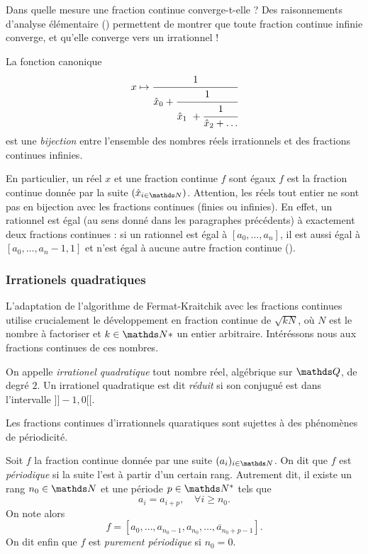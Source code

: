 Dans quelle mesure une fraction continue converge-t-elle ? Des raisonnements
d'analyse élémentaire () permettent de montrer que toute fraction
continue infinie converge, et qu'elle converge vers un irrationnel !

\begin{theoreme}
	La fonction canonique \[x \mapsto \cfrac{1}{\hat{x}_0 +
	\cfrac{1}{\hat{x}_1 + \cfrac{1}{\hat{x}_2 + \dots}}}\] est une
	\emph{bijection} entre l'ensemble des nombres réels irrationnels et des
	fractions continues infinies.
\end{theoreme}

En particulier, un réel $x$ et une fraction continue $f$ sont égaux \ssi $f$
est la fraction continue donnée par la suite $(\hat{x}_{i\in \N})$. Attention,
les réels tout entier ne sont pas en bijection avec les fractions continues
(finies ou infinies). En effet, un rationnel est égal (au sens donné dans les
paragraphes précédents) à exactement deux fractions continues : si un rationnel
est égal à $[a_0, \dots, a_n]$, il est aussi égal à $[a_0, \dots, a_n - 1, 1]$
et n'est égal à aucune autre fraction continue ().

\subsubsection{Irrationels quadratiques}

L'adaptation de l'algorithme de Fermat-Kraitchik avec les fractions continues
utilise crucialement le développement en fraction continue de $\sqrt{kN}$, où
$N$ est le nombre à factoriser et $k\in \N*$ un entier arbitraire. Intéréssons
nous aux fractions continues de ces nombres.

\begin{definition}
	On appelle \emph{irrationel quadratique} tout nombre réel, algébrique sur
	$\Q$, de degré $2$. Un irrationel quadratique est dit \emph{réduit} si son
	conjugué est dans l'intervalle $]\!]-1, 0[\![$.
\end{definition}

Les fractions continues d'irrationnels quaratiques sont sujettes à des
phénomènes de périodicité.

\begin{definition}
	Soit $f$ la fraction continue donnée par une suite $(a_i)_{i\in \N}$. On
	dit que $f$ est \emph{périodique} si la suite l'est à partir d'un certain
	rang.  Autrement dit, il existe un rang $n_0\in \N$ et une période $p\in
	\N^*$ tels que \[a_{i} = a_{i+p}, \quad \forall i\geq n_0.\] On note alors
	\[f = [a_0, \dots, a_{n_0 - 1}, \overline{a_{n_0}, \dots, a_{n_0 + p
	-1}}].\] On dit enfin que $f$ est \emph{purement périodique} si $n_0 = 0$.
\end{definition}

